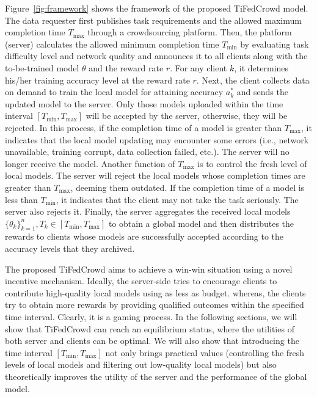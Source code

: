 \documentclass[final,1p,times]{elsarticle}
\begin{document}
Figure~\ref{fig:framework} shows the framework of the proposed TiFedCrowd model. The data requester first publishes task requirements and the allowed maximum completion time $T_{\max}$ through a crowdsourcing platform. Then, the platform (server) calculates the allowed minimum completion time $T_{\min}$ by evaluating task difficulty level and network quality and announces it to all clients along with the to-be-trained model $\theta$ and the reward rate $r$. For any client $k$, it determines his/her training accuracy level at the reward rate $r$. Next, the client collects data on demand to train the local model for attaining accuracy $a_k^\ast$ and sends the updated model to the server. Only those models uploaded within the time interval $[T_{\min},T_{\max}]$ will be accepted by the server, otherwise, they will be rejected. In this process, if the completion time of a model is greater than $T_{\max}$, it indicates that the local model updating may encounter some errors (i.e., network unavailable, training corrupt, data collection failed, etc.). The server will no longer receive the model. Another function of $T_{\max}$ is to control the fresh level of local models. The server will reject the local models whose completion times are greater than $T_{\max}$, deeming them outdated. If the completion time of a model is less than $T_{\min}$, it indicates that the client may not take the task seriously. The server also rejects it.  Finally, the server aggregates the received local models $\{\theta_k\}_{k=1}^n,T_k\in[T_{\min},T_{\max}]$ to obtain a global model and then distributes the rewards to clients whose models are successfully accepted according to the accuracy levels that they archived. 

The proposed TiFedCrowd aims to achieve a win-win situation using a novel incentive mechanism. Ideally, the server-side tries to encourage clients to contribute high-quality local models using as less as budget. whereas, the clients try to obtain more rewards by providing qualified outcomes within the specified time interval. Clearly, it is a gaming process. In the following sections, we will show that TiFedCrowd can reach an equilibrium status, where the utilities of both server and clients can be optimal. We will also show that introducing the time interval $[T_{\min}, T_{\max}]$ not only brings practical values (controlling the fresh levels of local models and filtering out low-quality local models) but also theoretically improves the utility of the server and the performance of the global model.
\end{document}
